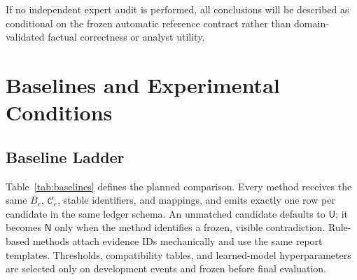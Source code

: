 \documentclass[conference]{IEEEtran}
\begin{document}
If no independent expert audit is performed, all conclusions will be described as conditional on the frozen automatic reference contract rather than domain-validated factual correctness or analyst utility.

\FloatBarrier
\section{Baselines and Experimental Conditions}

\subsection{Baseline Ladder}

Table~\ref{tab:baselines} defines the planned comparison. Every method receives the same $B_e$, $\mathcal{C}_e$, stable identifiers, and mappings, and emits exactly one row per candidate in the same ledger schema. An unmatched candidate defaults to $\mathsf{U}$; it becomes $\mathsf{N}$ only when the method identifies a frozen, visible contradiction. Rule-based methods attach evidence IDs mechanically and use the same report templates. Thresholds, compatibility tables, and learned-model hyperparameters are selected only on development events and frozen before final evaluation.
\end{document}
